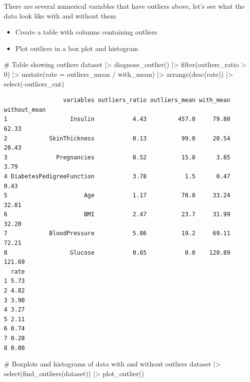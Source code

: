 \documentclass[
  letterpaper,
  DIV=11,
  numbers=noendperiod]{scrreprt}
\newenvironment{Shaded}{\begin{snugshade}}{\end{snugshade}}
\newcommand{\AttributeTok}[1]{\textcolor[rgb]{0.40,0.45,0.13}{#1}}
\newcommand{\CommentTok}[1]{\textcolor[rgb]{0.37,0.37,0.37}{#1}}
\newcommand{\DecValTok}[1]{\textcolor[rgb]{0.68,0.00,0.00}{#1}}
\newcommand{\FunctionTok}[1]{\textcolor[rgb]{0.28,0.35,0.67}{#1}}
\newcommand{\NormalTok}[1]{\textcolor[rgb]{0.00,0.23,0.31}{#1}}
\newcommand{\SpecialCharTok}[1]{\textcolor[rgb]{0.37,0.37,0.37}{#1}}
\begin{document}
There are several numerical variables that have outliers above, let's
see what the data look like with and without them

\begin{itemize}
\item
  Create a table with columns containing outliers
\item
  Plot outliers in a box plot and histogram
\end{itemize}

\begin{Shaded}
\begin{Highlighting}[]
\CommentTok{\# Table showing outliers}
\NormalTok{dataset }\SpecialCharTok{|\textgreater{}}
  \FunctionTok{diagnose\_outlier}\NormalTok{() }\SpecialCharTok{|\textgreater{}}
  \FunctionTok{filter}\NormalTok{(outliers\_ratio }\SpecialCharTok{\textgreater{}} \DecValTok{0}\NormalTok{) }\SpecialCharTok{|\textgreater{}}  
  \FunctionTok{mutate}\NormalTok{(}\AttributeTok{rate =}\NormalTok{ outliers\_mean }\SpecialCharTok{/}\NormalTok{ with\_mean) }\SpecialCharTok{|\textgreater{}}
  \FunctionTok{arrange}\NormalTok{(}\FunctionTok{desc}\NormalTok{(rate)) }\SpecialCharTok{|\textgreater{}} 
  \FunctionTok{select}\NormalTok{(}\SpecialCharTok{{-}}\NormalTok{outliers\_cnt)}
\end{Highlighting}
\end{Shaded}

\begin{verbatim}
                 variables outliers_ratio outliers_mean with_mean without_mean
1                  Insulin           4.43         457.0     79.80        62.33
2            SkinThickness           0.13          99.0     20.54        20.43
3              Pregnancies           0.52          15.0      3.85         3.79
4 DiabetesPedigreeFunction           3.78           1.5      0.47         0.43
5                      Age           1.17          70.0     33.24        32.81
6                      BMI           2.47          23.7     31.99        32.20
7            BloodPressure           5.86          19.2     69.11        72.21
8                  Glucose           0.65           0.0    120.89       121.69
  rate
1 5.73
2 4.82
3 3.90
4 3.27
5 2.11
6 0.74
7 0.28
8 0.00
\end{verbatim}

\begin{Shaded}
\begin{Highlighting}[]
\CommentTok{\# Boxplots and histograms of data with and without outliers}
\NormalTok{dataset }\SpecialCharTok{|\textgreater{}}
  \FunctionTok{select}\NormalTok{(}\FunctionTok{find\_outliers}\NormalTok{(dataset)) }\SpecialCharTok{|\textgreater{}}
           \FunctionTok{plot\_outlier}\NormalTok{()}
\end{Highlighting}
\end{Shaded}
\end{document}
